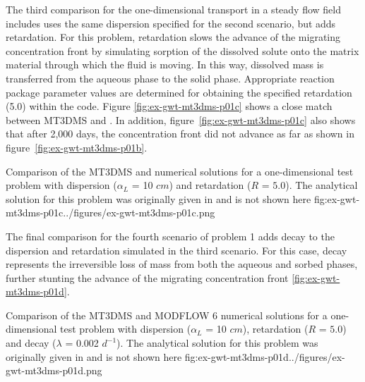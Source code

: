 The third comparison for the one-dimensional transport in a steady flow field includes uses the same dispersion specified for the second scenario, but adds retardation.  For this problem, retardation slows the advance of the migrating concentration front by simulating sorption of the dissolved solute onto the matrix material through which the fluid is moving. In this way, dissolved mass is transferred from the aqueous phase to the solid phase. Appropriate reaction package parameter values are determined for obtaining the specified retardation (5.0) within the code. Figure \ref{fig:ex-gwt-mt3dms-p01c} shows a close match between MT3DMS and \mf. In addition, figure~\ref{fig:ex-gwt-mt3dms-p01c} also shows that after 2,000 days, the concentration front did not advance as far as shown in figure~\ref{fig:ex-gwt-mt3dms-p01b}.

\begin{StandardFigure}
	{Comparison of the MT3DMS and \mf numerical solutions for a one-dimensional test problem with dispersion ($\alpha_L$ = 10 $cm$) and retardation ($R$ = $5.0$). The analytical solution for this problem was originally given in \cite{vanGenuchtenAlves1982} and is not shown here}
	{fig:ex-gwt-mt3dms-p01c}{../figures/ex-gwt-mt3dms-p01c.png}
\end{StandardFigure}

The final comparison for the fourth scenario of problem 1 adds decay to the dispersion and retardation simulated in the third scenario. For this case, decay represents the irreversible loss of mass from both the aqueous and sorbed phases, further stunting the advance of the migrating concentration front \ref{fig:ex-gwt-mt3dms-p01d}.  

\begin{StandardFigure}
	{Comparison of the MT3DMS and MODFLOW 6 numerical solutions for a one-dimensional test problem with dispersion ($\alpha_L$ = 10 $cm$), retardation ($R$ = $5.0$) and decay ($\lambda$ = 0.002 $d^{-1}$).  The analytical solution for this problem was originally given in \cite{vanGenuchtenAlves1982} and is not shown here}
	{fig:ex-gwt-mt3dms-p01d}{../figures/ex-gwt-mt3dms-p01d.png}
\end{StandardFigure}



